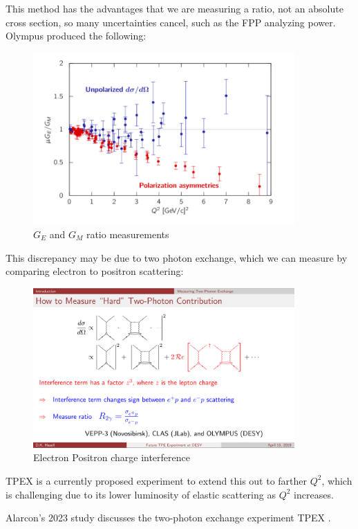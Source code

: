             This method has the advantages that we are measuring a ratio, not an absolute cross section, so many uncertainties cancel, such as the FPP analyzing power. Olympus produced the following:
            
                  
            \begin{figure}[H]
                \centering
                \includegraphics[width=10cm]{Chapters/Ch1-Intro/Ch1-Sec1-Background/pics/elastic-ep/olympus-form-factors.PNG}
                \caption{$G_E$ and $G_M$ ratio measurements}
            \end{figure}
            
            This discrepancy may be due to two photon exchange, which we can measure by comparing electron to positron scattering:
            
                  
            \begin{figure}[H]
                \centering
                \includegraphics[width=10cm]{Chapters/Ch1-Intro/Ch1-Sec1-Background/pics/elastic-ep/tpex.PNG}
                \caption{Electron Positron charge interference}
            \end{figure}
        
        
            TPEX is a currently proposed experiment to extend this out to farther $Q^2$, which is challenging due to its lower luminosity of elastic scattering as $Q^2$ increases.    

            Alarcon's 2023 study discusses the two-photon exchange experiment TPEX \cite{Alarcon2023Two-PhotonTPEX}.

            



